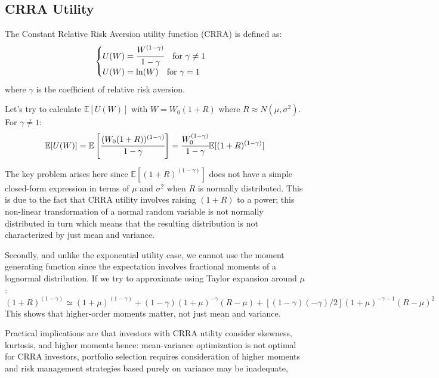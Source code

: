 \subsection{CRRA Utility}

The Constant Relative Risk Aversion utility function (CRRA) is defined as:
\begin{equation}
\begin{cases}
U(W) = \cfrac{W^{(1-\gamma)}}{1-\gamma}\quad\text{for $\gamma \neq 1$}\\
U(W) = \ln(W)\quad\text{for $\gamma = 1$}
\end{cases}
\end{equation}
where $\gamma$ is the coefficient of relative risk aversion.

Let's try to calculate $\mathbb{E}[U(W)]$ with $W = W_0(1 + R)$ where $R\approx N(\mu, \sigma^2)$.
For $\gamma\neq 1$:
\begin{equation*}
\mathbb{E}[U(W)] = \mathbb{E}\left[\cfrac{(W_0(1 + R))^{(1-\gamma)}}{1-\gamma}\right] = \cfrac{W_0^{(1-\gamma)}}{1-\gamma}\mathbb{E}[(1 + R)^{(1-\gamma)}]
\end{equation*}

The key problem arises here since $\mathbb{E}[(1 + R)^(1-\gamma)]$ does not have a simple closed-form expression in terms of $\mu$ and $\sigma^2$ when $R$ is normally distributed. This is due to the fact that CRRA utility involves raising $(1 + R)$ to a power; this non-linear transformation of a normal random variable is not normally distributed in turn which means that the resulting distribution is not characterized by just mean and variance.

Secondly, and unlike the exponential utility case, we cannot use the moment generating function since the expectation involves fractional moments of a lognormal distribution. If we try to approximate using Taylor expansion around $\mu$:
\begin{equation*}
(1 + R)^{(1-\gamma)} \simeq (1 + \mu)^{(1-\gamma)} + (1-\gamma)(1 + \mu)^{-\gamma}(R-\mu) + [(1-\gamma)(-\gamma)/2](1 + \mu)^{-\gamma-1}(R-\mu)^2
\end{equation*}
This shows that higher-order moments matter, not just mean and variance.

Practical implications are that investors with CRRA utility consider skewness, kurtosis, and higher moments hence: mean-variance optimization is not optimal for CRRA investors, portfolio selection requires consideration of higher moments and risk management strategies based purely on variance may be inadequate,

